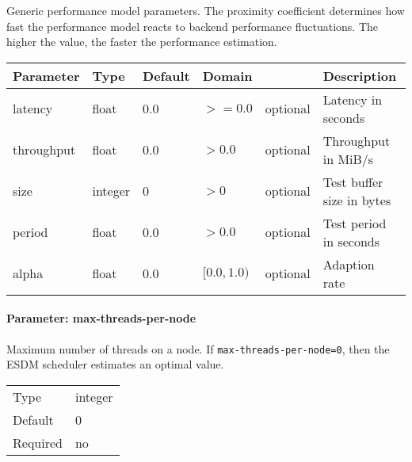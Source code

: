  Generic performance model parameters.
  The proximity coefficient determines how fast the performance model reacts to backend performance fluctuations.
  The higher the value, the faster the performance estimation.
    \begin{tabularx}{\textwidth}{lllllX}
      Parameter  & Type    & Default & Domain      &          & Description               \\ 
      \hline
      latency    & float   & 0.0     & $>=0.0$     & optional & Latency in seconds        \\ 
      throughput & float   & 0.0     & $>0.0$      & optional & Throughput in MiB/s       \\ 
      size       & integer & 0       & $>0$        & optional & Test buffer size in bytes \\ 
      period     & float   & 0.0     & $>0.0$      & optional & Test period in seconds    \\ 
      alpha      & float   & 0.0     & $[0.0,1.0)$ & optional & Adaption rate             \\ 
    \end{tabularx}

\FloatBarrier
\vspace{\gapsize}


\paragraph{Parameter: max-threads-per-node}
Maximum number of threads on a node.
If \lstinline|max-threads-per-node=0|, then the ESDM scheduler estimates an optimal value.

\begin{preserve}
  \noindent
  \begin{tabular}{ll}
    Type     & integer \\ 
    Default  & 0       \\ 
    Required & no      \\ 
  \end{tabular}
\end{preserve}
\FloatBarrier
\vspace{\gapsize}

